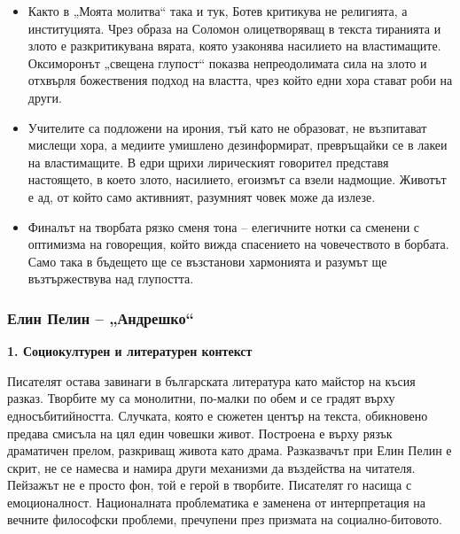 \documentclass[12pt,a4paper]{article}
\begin{document}
\begin{itemize}[leftmargin=*]
\vspace{-0.45cm}
\item Както в „Моята молитва“ така и тук, Ботев критикува не религията, а институцията. Чрез образа на Соломон олицетворяващ в текста тиранията и злото е разкритикувана вярата, която узаконява насилието на властимащите. Оксиморонът „свещена глупост“ показва непреодолимата сила на злото и отхвърля божествения подход на властта, чрез който едни хора стават роби на други.
\end{itemize}

\begin{itemize}[leftmargin=*]
\vspace{-0.45cm}
\item Учителите са подложени на ирония, тъй като не образоват, не възпитават мислещи хора, а медиите умишлено дезинформират, превръщайки се в лакеи на властимащите. В едри щрихи лирическият говорител представя настоящето, в което злото, насилието, егоизмът са взели надмощие. Животът е ад, от който само активният, разумният човек може да излезе.
\end{itemize}

\begin{itemize}[leftmargin=*]
\vspace{-0.45cm}
\item Финалът на творбата рязко сменя тона – елегичните нотки са сменени с оптимизма на говорещия, който вижда спасението на човечеството в борбата. Само така в бъдещето ще се възстанови хармонията и разумът ще възтържествува над глупостта.
\end{itemize}

\newpage

\subsubsection{\colorbox{green!40}{Елин Пелин – „Андрешко“}}
\textbf{1. Социокултурен и литературен контекст}
\vspace{0.1cm}

\indent Писателят остава завинаги в българската литература като майстор на късия разказ. Творбите му са монолитни, по-малки по обем и се градят върху едносъбитийността. Случката, която е сюжетен център на текста, обикновено предава смисъла на цял един човешки живот. Построена е върху рязък драматичен прелом, разкриващ живота като драма. Разказвачът при Елин Пелин е скрит, не се намесва и намира други механизми да въздейства на читателя. Пейзажът не е просто фон, той е герой в творбите. Писателят го насища с емоционалност. Националната проблематика е заменена от интерпретация на вечните философски проблеми, пречупени през призмата на социално-битовото.
\end{document}
